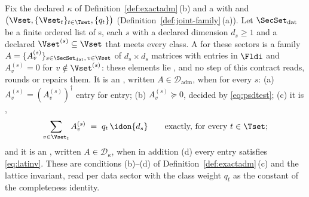 \begin{definition}\label{def:reduction-instance}
Fix the declared  $\kappa$ of
Definition~\ref{def:exactadm}\,(b) and a  with
 and  $\big(\Vset,\{\Vset_t\}_{t\in\Tset},\{q_t\}\big)$
(Definition~\ref{def:joint-family}\,(a)). Let $\SecSet_{\mathrm{dat}}$ be a
finite ordered list of
s,
each $s$ with a declared dimension $d_s\ge1$ and a declared
$\Vset^{(s)}\subseteq\Vset$ that meets every class. A
for these sectors is a family
$A=\{A^{(s)}_v\}_{s\in\SecSet_{\mathrm{dat}},\,v\in\Vset}$ of $d_s\times d_s$
matrices with entries in $\Fldi$ and $A^{(s)}_v=0$ for
$v\notin\Vset^{(s)}$: these elements lie
,
and no step of this contract reads, rounds or repairs them. It is an
,
written $A\in\mathcal{D}_{\mathrm{adm}}$, when for every $s$:
(a) $A^{(s)}_v=(A^{(s)}_v)^{\dagger}$ entry for entry; (b)
$A^{(s)}_v\succeq0$, decided by \eqref{eq:psdtest}; (c) it is
,
\begin{equation}\label{eq:classcomplete}
  \sum_{v\in\Vset_t}A^{(s)}_v\;=\;q_t\,\idon{d_s}
  \qquad\text{exactly, for every }t\in\Tset ;
\end{equation}
and it is an
,
written $A\in\mathcal{D}_{\kappa}$, when in addition (d) every entry
satisfies \eqref{eq:latinv}. These are conditions (b)--(d) of
Definition~\ref{def:exactadm}\,(c) and the lattice invariant, read per data
sector with the class weight $q_t$ as the constant of the completeness
identity.


\end{definition}
